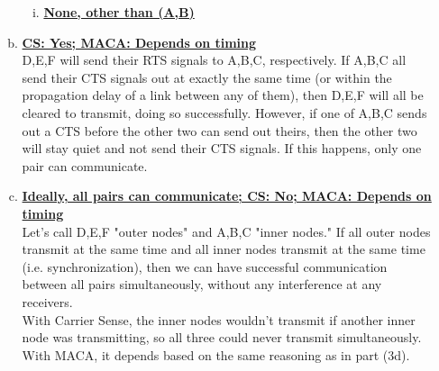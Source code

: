 \documentclass[11pt,fleqn]{article}
\begin{document}
\begin{enumerate}[Q1.]
\begin{enumerate}[(a)]
\begin{enumerate}[i.]
\item \textbf{\underline{None, other than (A,B)}}
\end{enumerate}
\item \textbf{\underline{CS: Yes; MACA: Depends on timing}} \\
D,E,F will send their RTS signals to A,B,C, respectively. If A,B,C all send their CTS signals out at exactly the same time (or within the propagation delay of a link between any of them), then D,E,F will all be cleared to transmit, doing so successfully. However, if one of A,B,C sends out a CTS before the other two can send out theirs, then the other two will stay quiet and not send their CTS signals. If this happens, only one pair can communicate.
\item \textbf{\underline{Ideally, all pairs can communicate; CS: No; MACA: Depends on timing}} \\
Let's call D,E,F "outer nodes" and A,B,C "inner nodes." If all outer nodes transmit at the same time and all inner nodes transmit at the same time (i.e. synchronization), then we can have successful communication between all pairs simultaneously, without any interference at any receivers. \\
With Carrier Sense, the inner nodes wouldn't transmit if another inner node was transmitting, so all three could never transmit simultaneously. \\
With MACA, it depends based on the same reasoning as in part (3d).
\end{enumerate}


\end{enumerate}
\end{document}
